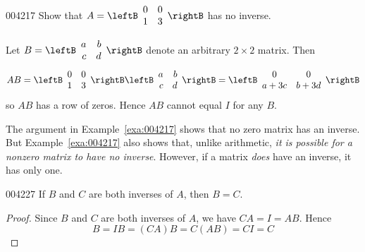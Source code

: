 \hspace*{0em}\vspace*{-3em}
\begin{example}{}{004217}
Show that $A = \leftB \begin{array}{rr}
0 & 0 \\
1 & 3
\end{array} \rightB$
 has no inverse.


\begin{solution}
  Let $B = \leftB \begin{array}{rr}
  a & b \\
  c & d
  \end{array} \rightB$
 denote an arbitrary $2 \times 2$ matrix. Then
\begin{equation*}
AB = \leftB \begin{array}{rr}
0 & 0 \\
1 & 3
\end{array} \rightB \leftB \begin{array}{rr}
a & b \\
c & d
\end{array} \rightB = \leftB \begin{array}{cc}
0 & 0 \\
a + 3c & b + 3d
\end{array} \rightB
\end{equation*}
so $AB$ has a row of zeros. Hence $AB$ cannot equal $I$ for any $B$.
\end{solution}
\end{example}

\vspace*{-1em}
The argument in Example~\ref{exa:004217} shows that no zero matrix has an inverse. But Example~\ref{exa:004217} also shows that, unlike arithmetic, \textit{it is possible for a nonzero matrix to have no inverse}. However, if a matrix \textit{does} have an inverse, it has only one.

\vspace*{-1em}
\begin{theorem}{}{004227}
If $B$ and $C$ are both inverses of $A$, then $B = C$.
\end{theorem}

\begin{proof}
Since $B$ and $C$ are both inverses of $A$, we have $CA = I = AB$. Hence 
\begin{equation*}
B = IB = (CA)B = C(AB) = CI = C
\end{equation*}
\end{proof}

